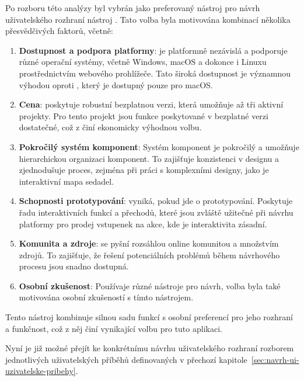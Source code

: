 Po rozboru této analýzy byl vybrán jako preferovaný nástroj pro návrh uživatelského rozhraní nástroj \textbf{}.
Tato volba byla motivována kombinací několika přesvědčivých faktorů, včetně:

\begin{enumerate}
    \item \textbf{Dostupnost a podpora platformy}:  je platformně nezávislá a podporuje různé operační systémy, včetně Windows, macOS a dokonce i Linuxu prostřednictvím webového prohlížeče.
    Tato široká dostupnost je významnou výhodou oproti , který je dostupný pouze pro macOS\@.
    \item \textbf{Cena}:  poskytuje robustní bezplatnou verzi, která umožňuje až tři aktivní projekty.
    Pro tento projekt jsou funkce poskytované v bezplatné verzi dostatečné, což z  činí ekonomicky výhodnou volbu.
    \item \textbf{Pokročilý systém komponent}: Systém komponent  je pokročilý a umožňuje hierarchickou organizaci komponent.
    To zajišťuje konzistenci v designu a zjednodušuje proces, zejména při práci s komplexními designy, jako je interaktivní mapa sedadel.
    \item \textbf{Schopnosti prototypování}:  vyniká, pokud jde o prototypování.
    Poskytuje řadu interaktivních funkcí a přechodů, které jsou zvláště užitečné při návrhu platformy pro prodej vstupenek na akce, kde je interaktivita zásadní.
    \item \textbf{Komunita a zdroje}:  se pyšní rozsáhlou online komunitou a množstvím zdrojů.
    To zajišťuje, že řešení potenciálních problémů během návrhového procesu jsou snadno dostupná.
    \item \textbf{Osobní zkušenost}: Používaje různé nástroje pro návrh, volba  byla také motivována osobní zkušeností s tímto nástrojem.
\end{enumerate}

Tento nástroj kombinuje silnou sadu funkcí s osobní preferencí pro jeho rozhraní a funkčnost, což z něj činí vynikající volbu pro tuto aplikaci.

Nyní je již možné přejít ke konkrétnímu návrhu uživatelského rozhraní rozborem jednotlivých uživatelských příběhů definovaných v přechozí kapitole~\ref{sec:navrh-ui-uzivatelske-pribehy}.

